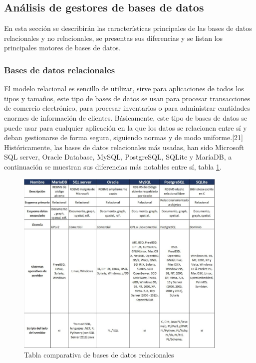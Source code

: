 \subsection{ Análisis de gestores de bases de datos} 

En esta sección se describirán las características principales de las bases de datos 
relacionales y no relacionales, se presentas sus diferencias y se listan los principales 
motores de bases de datos.
\subsubsection{Bases de datos relacionales}


El modelo relacional es sencillo de utilizar, sirve para aplicaciones de todos los tipos y 
tamaños, este tipo de bases de datos se usan para procesar transacciones de comercio 
electrónico, para procesar inventarios o para administrar cantidades enormes de 
información de clientes. Básicamente, este tipo de bases de datos se puede usar para 
cualquier aplicación en la que los datos se relacionen entre sí y deban gestionarse de forma 
segura, siguiendo normas y de modo uniforme.[21] 
Históricamente, las bases de datos relacionales más usadas, han sido Microsoft SQL 
server, Oracle Database, MySQL, PostgreSQL, SQLite y MaríaDB, a continuación se 
muestran sus diferencias más notables entre sí, tabla \ref{fig:AGFDA}.



\begin{figure}[H]
	
	\centering
	
	\includegraphics[width=0.90\textwidth]{Capitulo4/Img/GestionRnf/BaseDatos}
	\caption{Tabla comparativa de bases de datos relacionales}
	\label{fig:AGFDA}
\end{figure}
